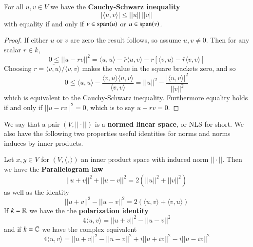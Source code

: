\begin{theorem}
    For all $u,v \in V$ we have the \textbf{Cauchy-Schwarz inequality} \begin{equation*}
        |\langle u,v\rangle| \leq ||u||\,||v||
    \end{equation*}
    with equality if and only if $v \in \operatorname{span}(u)$ or $u \in \operatorname{span}(v)$.
\end{theorem}
\begin{proof}
    If either $u$ or $v$ are zero the result follows, so assume $u,v \neq 0$. Then for any scalar $r \in k$, \begin{equation*}
        0 \leq ||u-rv||^2 = \langle u,u\rangle - \overline{r}\langle u,v\rangle - r[\langle v,u\rangle - \overline{r}\langle v,v\rangle] 
    \end{equation*}
    Choosing $r = \overline{\langle v,u\rangle}/\langle v,v\rangle$ makes the value in the square brackets zero, and so \begin{equation*}
        0 \leq \langle u,u\rangle - \frac{\langle v,u\rangle\langle u,v\rangle}{\langle v,v\rangle} = ||u||^2 - \frac{|\langle u,v\rangle|^2}{||v||^2}
    \end{equation*}
    which is equivalent to the Cauchy-Schwarz inequality. Furthermore equality holds if and only if $||u-rv||^2 = 0$, which is to say $u - rv = 0$.
\end{proof}

We say that a pair $(V,||\cdot||)$ is a \textbf{normed linear space}, or NLS for short. We also have the following two properties useful identities for norms and norms induces by inner products.

\begin{proposition}
    Let $x,y \in V$ for $(V,\langle ,\rangle)$ an inner product space with induced norm $||\cdot ||$. Then we have the \textbf{Parallelogram law} \begin{equation*}
        ||u+v||^2+||u-v||^2 = 2(||u||^2+||v||^2)
    \end{equation*}
    as well as the identity \begin{equation*}
        ||u+v||^2-||u-v||^2 = 2(\langle u,v\rangle + \langle v,u\rangle)
    \end{equation*}
    If $k = \mathbb R$ we have the the \textbf{polarization identity}
    \begin{equation*}
        4\langle u,v\rangle = ||u+v||^2-||u-v||^2
    \end{equation*}
    and if $k = \mathbb C$ we have the complex equivalent \begin{equation*}
        4\langle u,v\rangle = ||u+v||^2-||u-v||^2 + i||u+iv||^2 - i||u-iv||^2
    \end{equation*}
\end{proposition}


